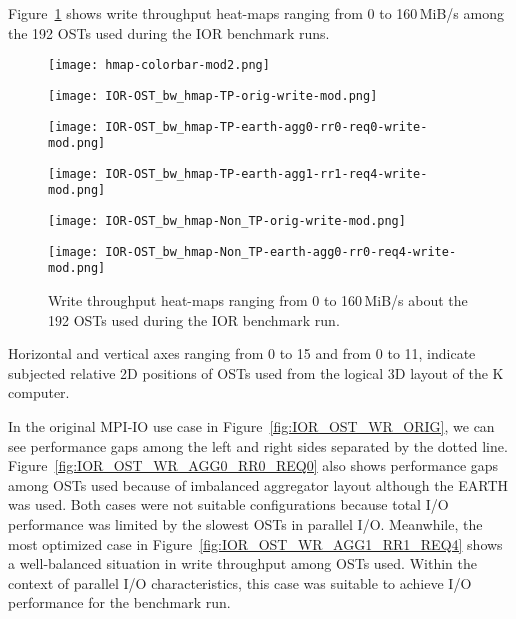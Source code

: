 \documentclass{jhps}
\begin{document}
Figure~\ref{fig:IOR_OST_BW_HMAP_WR} shows write throughput heat-maps
ranging from 0 to 160\,MiB/s
among the 192 OSTs used during the IOR benchmark runs.
%
\begin{figure}[tb]
\begin{minipage}[t]{0.06\textwidth}
 \texttt{[image: hmap-colorbar-mod2.png]}
\end{minipage}
%
\noindent
\begin{minipage}[t]{0.3\textwidth}
 \centering
 \texttt{[image: IOR-OST\_bw\_hmap-TP-orig-write-mod.png]}
 \label{fig:IOR_OST_WR_ORIG}
\end{minipage}
%
\noindent
\begin{minipage}[t]{0.3\textwidth}
 \centering
 \texttt{[image: IOR-OST\_bw\_hmap-TP-earth-agg0-rr0-req0-write-mod.png]}
 \label{fig:IOR_OST_WR_AGG0_RR0_REQ0}
\end{minipage}
%
\noindent
\begin{minipage}[t]{0.3\textwidth}
 \centering
 \texttt{[image: IOR-OST\_bw\_hmap-TP-earth-agg1-rr1-req4-write-mod.png]}
 \label{fig:IOR_OST_WR_AGG1_RR1_REQ4}
\end{minipage}
%
\begin{minipage}[t]{0.3\textwidth}
 \centering
 \texttt{[image: IOR-OST\_bw\_hmap-Non\_TP-orig-write-mod.png]}
 \label{fig:IOR_OST_WR_NTP_ORIG}
\end{minipage}
%
\begin{minipage}[t]{0.3\textwidth}
 \centering
 \texttt{[image: IOR-OST\_bw\_hmap-Non\_TP-earth-agg0-rr0-req4-write-mod.png]}
 \label{fig:IOR_OST_WR_NTP_AGG0_RR0_REQ4}
\end{minipage}
%
\caption{Write throughput heat-maps ranging from 0 to 160\,MiB/s
about the 192 OSTs used during the IOR benchmark run.}
\label{fig:IOR_OST_BW_HMAP_WR}
\end{figure}
%
Horizontal and vertical axes ranging from 0 to 15 and from 0 to 11,
indicate subjected relative 2D positions of OSTs used from the logical 3D layout
of the K computer.

In the original MPI-IO use case in Figure~\ref{fig:IOR_OST_WR_ORIG},
we can see performance gaps among the left and right sides separated by
the dotted line.
Figure~\ref{fig:IOR_OST_WR_AGG0_RR0_REQ0}
also shows performance gaps among OSTs used
because of imbalanced aggregator layout although the EARTH was used.
Both cases were not suitable configurations because total I/O performance
was limited by the slowest OSTs in parallel I/O.
Meanwhile, the most optimized case in Figure~\ref{fig:IOR_OST_WR_AGG1_RR1_REQ4}
shows a well-balanced situation in write throughput among OSTs used.
Within the context of parallel I/O characteristics,
this case was suitable to achieve I/O performance for the benchmark run.
\end{document}
